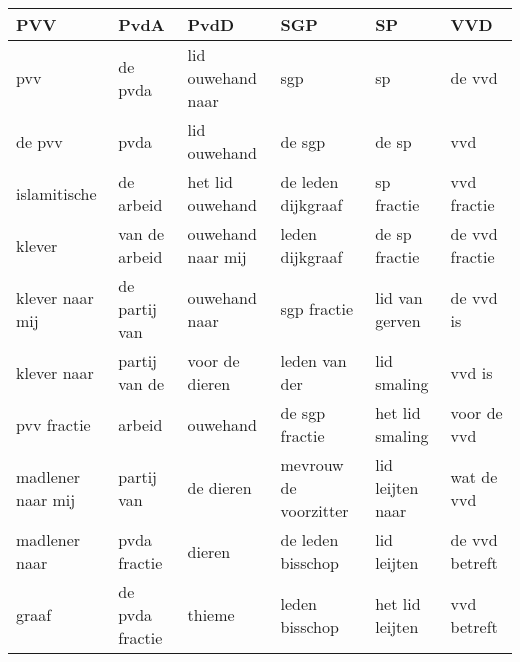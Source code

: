 \begin{tabular}{llllll}
\toprule
               PVV &             PvdA &               PvdD &                    SGP &                SP &             VVD \\
\midrule
               pvv &          de pvda &  lid ouwehand naar &                    sgp &                sp &          de vvd \\
            de pvv &             pvda &       lid ouwehand &                 de sgp &             de sp &             vvd \\
      islamitische &        de arbeid &   het lid ouwehand &     de leden dijkgraaf &        sp fractie &     vvd fractie \\
            klever &    van de arbeid &  ouwehand naar mij &        leden dijkgraaf &     de sp fractie &  de vvd fractie \\
   klever naar mij &    de partij van &      ouwehand naar &            sgp fractie &    lid van gerven &       de vvd is \\
       klever naar &    partij van de &     voor de dieren &          leden van der &       lid smaling &          vvd is \\
       pvv fractie &           arbeid &           ouwehand &         de sgp fractie &   het lid smaling &     voor de vvd \\
 madlener naar mij &       partij van &          de dieren &  mevrouw de voorzitter &  lid leijten naar &      wat de vvd \\
     madlener naar &     pvda fractie &             dieren &      de leden bisschop &       lid leijten &  de vvd betreft \\
             graaf &  de pvda fractie &             thieme &         leden bisschop &   het lid leijten &     vvd betreft \\
\bottomrule
\end{tabular}
